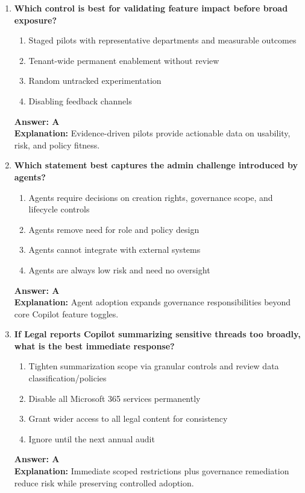 \documentclass[10pt]{article}
\begin{document}
\begin{enumerate}[leftmargin=*]
\item \textbf{Which control is best for validating feature impact before broad exposure?}
\begin{enumerate}[label=\Alph*.]
  \item Staged pilots with representative departments and measurable outcomes
  \item Tenant-wide permanent enablement without review
  \item Random untracked experimentation
  \item Disabling feedback channels
\end{enumerate}
\textbf{Answer: A}\\
\textbf{Explanation:} Evidence-driven pilots provide actionable data on usability, risk, and policy fitness.

\item \textbf{Which statement best captures the admin challenge introduced by agents?}
\begin{enumerate}[label=\Alph*.]
  \item Agents require decisions on creation rights, governance scope, and lifecycle controls
  \item Agents remove need for role and policy design
  \item Agents cannot integrate with external systems
  \item Agents are always low risk and need no oversight
\end{enumerate}
\textbf{Answer: A}\\
\textbf{Explanation:} Agent adoption expands governance responsibilities beyond core Copilot feature toggles.

\item \textbf{If Legal reports Copilot summarizing sensitive threads too broadly, what is the best immediate response?}
\begin{enumerate}[label=\Alph*.]
  \item Tighten summarization scope via granular controls and review data classification/policies
  \item Disable all Microsoft 365 services permanently
  \item Grant wider access to all legal content for consistency
  \item Ignore until the next annual audit
\end{enumerate}
\textbf{Answer: A}\\
\textbf{Explanation:} Immediate scoped restrictions plus governance remediation reduce risk while preserving controlled adoption.


\end{enumerate}
\end{document}
